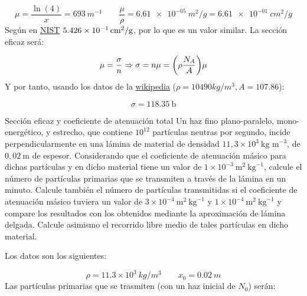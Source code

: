 \begin{equation}
    \mu = \frac{\ln (4)}{x} = 693\ \unit{m^{-1}} \qquad \frac{\mu}{\rho} = \SI{6.61e-05}{m^2/g} = \SI{6.61e-01}{cm^2/g}
\end{equation}
Según en \href{https://physics.nist.gov/PhysRefData/Xcom/html/xcom1.html}{NIST} $\SI{5.426E-01}{cm^2/g}$, por lo que es un valor similar. La sección eficaz será: 

\begin{equation}
    \mu = \frac{\sigma}{n} \Rightarrow \sigma = n \mu = \pqty{\rho \frac{N_A}{A}} \mu
\end{equation}
Y por tanto, usando los datos de la \href{https://es.wikipedia.org/wiki/Plata}{wikipedia} ($\rho=10490 \unit{kg/m^3}, A=107.86$):

\begin{equation}
    \sigma = \SI{118.35}{\barn}
\end{equation}


\begin{Ejercicio}{Sección eficaz y coeficiente de atenuación total} 
    Un haz fino plano-paralelo, mono-energético, y estrecho, que contiene $10^{12}$ partículas neutras por segundo, incide perpendicularmente en una lámina de material de densidad $11,3 \times 10^{3}\ \text{kg m}^{-3}$, de $0,02\ \text{m}$ de espesor. Considerando que el coeficiente de atenuación másico para dichas partículas y en dicho material tiene un valor de $1 \times 10^{-3}\ \text{m}^2 \ \text{kg}^{-1}$, calcule el número de partículas primarias que se transmiten a través de la lámina en un minuto. Calcule también el número de partículas transmitidas si el coeficiente de atenuación másico tuviera un valor de $3 \times 10^{-4}\ \text{m}^2 \ \text{kg}^{-1}$ y $1 \times 10^{-4}\ \text{m}^2 \ \text{kg}^{-1}$ y compare los resultados con los obtenidos mediante la aproximación de lámina delgada. Calcule asimismo el recorrido libre medio de tales partículas en dicho material.
\end{Ejercicio}

Los datos son los siguientes:

\[ \rho=11.3\times 10^3  \ \unit{kg/m^3} \qquad x_0 = 0.02 \ \unit{m} \]
Las partículas primarias que se trasmiten (con un haz inicial de $N_0$) serán:

